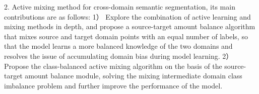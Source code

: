 2. Active mixing method for cross-domain semantic segmentation, its main contributions are as follows:
 1） Explore the combination of active learning and mixing methods in depth, and propose a source-target amount balance algorithm that mixes source and target domain points with an equal number of labels, so that the model learns a more balanced knowledge of the two domains and resolves the issue of accumulating domain bias during model learning.
2） Propose the class-balanced active mixing algorithm on the basis of the source-target amount balance module, solving the mixing intermediate domain class imbalance problem and further improve the performance of the model.

